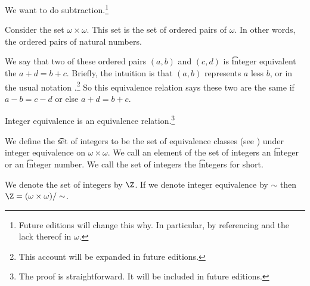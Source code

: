 

We want to do subtraction.\footnote{Future editions will change this why. In particular, by referencing  and the lack thereof in $\omega$.}


Consider the set $\omega \times \omega$.
This set is the set of ordered pairs of $\omega$.
In other words, the ordered pairs of natural numbers.

We say that two of these ordered pairs $(a, b)$ and $(c, d)$ is \t{integer equivalent} the $a + d = b +c$.
Briefly, the intuition is that $(a, b)$ represents $a$ less $b$, or in the usual notation .\footnote{This account will be expanded in future editions.}
So this equivalence relation says these two are the same if $a - b = c - d$ or else $a + d = b + c$.

\begin{proposition}
	Integer equivalence is an equivalence relation.\footnote{The proof is straightforward. It will be included in future editions.}
\end{proposition}

We define the \t{set of integers} to be the set of equivalence classes (see ) under integer equivalence on $\omega \times \omega$.
We call an element of the set of integers an \t{integer} or an \t{integer number}.
We call the set of integers the \t{integers} for short.


We denote the set of integers by $\Z$.
If we denote integer equivalence by $\sim$ then $\Z = (\omega \times \omega)/\sim$.

\blankpage
